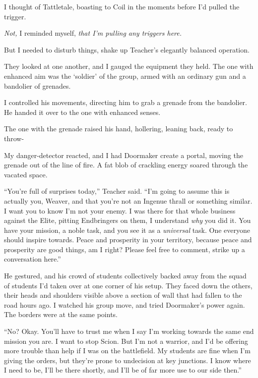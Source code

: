 I thought of Tattletale, boasting to Coil in the moments before I'd pulled the trigger.



\emph{Not,} I reminded myself, \emph{that I'm pulling any triggers here.}



But I needed to disturb things, shake up Teacher's elegantly balanced operation.



They looked at one another, and I gauged the equipment they held.  The one with enhanced aim was the `soldier' of the group, armed with an ordinary gun and a bandolier of grenades.



I controlled his movements, directing him to grab a grenade from the bandolier.  He handed it over to the one with enhanced senses.



The one with the grenade raised his hand, hollering, leaning back, ready to throw-



My danger-detector reacted, and I had Doormaker create a portal, moving the grenade out of the line of fire.  A fat blob of crackling energy soared through the vacated space.



``You're full of surprises today,'' Teacher said.  ``I'm going to assume this is actually you, Weaver, and that you're not an Ingenue thrall or something similar.  I want you to know I'm not your enemy.  I was there for that whole business against the Elite, pitting Endbringers on them, I understand \emph{why} you did it.  You have your mission, a noble task, and you see it as a \emph{universal }task.  One everyone should inspire towards.  Peace and prosperity in your territory, because peace and prosperity are good things, am I right?  Please feel free to comment, strike up a conversation here.''



He gestured, and his crowd of students collectively backed away from the squad of students I'd taken over at one corner of his setup.  They faced down the others, their heads and shoulders visible above a section of wall that had fallen to the road hours ago.  I watched his group move, and tried Doormaker's power again.  The borders were at the same points.



``No?  Okay.  You'll have to trust me when I say I'm working towards the same end mission you are.  I want to stop Scion.  But I'm not a warrior, and I'd be offering more trouble than help if I was on the battlefield.  My students are fine when I'm giving the orders, but they're prone to undecision at key junctions.  I know where I need to be, I'll be there shortly, and I'll be of far more use to our side then.''



